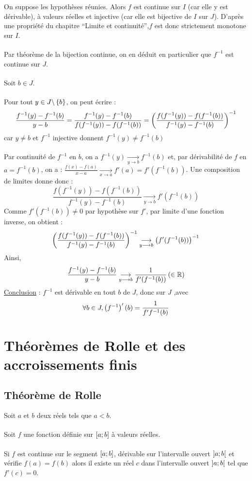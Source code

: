 \begin{dem}
    On suppose les hypothèses réunies. Alors \(f\) est continue sur \(I\) (car elle y est dérivable), à valeurs réelles et injective (car elle est bijective de \(I\) sur \(J\)). D’après une propriété du chapitre “Limite et continuité”,\(f\) est donc strictement monotone sur \(I\).\\~\\
    Par théorème de la bijection continue, on en déduit en particulier que \(f^{-1}\) est continue sur \(J\).\\~\\
    Soit \(b \in J\).\\~\\
    Pour tout \(y \in J\backslash \left\lbrace b\right\rbrace\), on peut écrire :
    \[\frac{f^{-1}(y)-f^{-1}(b)}{y-b} = \frac{f^{-1}(y) - f^{-1}(b)}{f(f^{-1}(y))-f(f^{-1}(b))} = \left(\frac{f(f^{-1}(y))-f(f^{-1}(b))}{f^{-1}(y) - f^{-1}(b)}\right)^{-1}\]
    car \(y \neq b \) et \(f^{-1}\) injective donnent \(f^{-1}(y) \neq f^{-1}(b)\)\\~\\
    Par continuité de \(f^{-1}\) en \(b\), on a \(f^{-1}(y) \underset{y \to b}{\to} f^{-1}(b)\) et, par dérivabilité de \(f\) en \(a = f^{-1}(b)\), on a : 
    \(\frac{f(x)-f(a)}{x-a} \underset{x \to a}{\to} f'(a) = f'(f^{-1}(b))\). Une composition de limites donne donc :
    \[\frac{f(f^{-1}(y))-f(f^{-1}(b))}{f^{-1}(y) - f^{-1}(b)} \underset{y \to b}{\to} f'(f^{-1}(b))\]
    Comme \(f'(f^{-1}(b))\neq 0 \) par hypothèse sur \(f'\), par limite d'une fonction inverse, on obtient : 
    \[\left(\frac{f(f^{-1}(y))-f(f^{-1}(b))}{f^{-1}(y) - f^{-1}(b)}\right)^{-1} \underset{y \longrightarrow b}{\longrightarrow} \left(f'(f^{-1}(b))\right)^{-1}\]
    Ainsi,
    \[\frac{f^{-1}(y)-f^{-1}(b)}{y-b} \underset{y \longrightarrow b}{\longrightarrow} \frac{1}{f'(f^{-1}(b))} \left( \in \mathbb{R}\right)\]
    \underline{Conclusion} : \(f^{-1}\) est dérivable en tout \(b\) de \(J\), donc sur \(J\) ,avec 
    \[\forall b \in J,\left(f^{-1}\right)'(b) = \frac{1}{f'f^{-1}(b)}\]
\end{dem}

\section{Théorèmes de Rolle et des accroissements finis}
\subsection{Théorème de Rolle}
\begin{theo}
    Soit \(a\) et \(b\) deux réels tels que \(a < b\).\\~\\
    Soit \(f\) une fonction définie sur \(\left[a;b\right]\) à valeurs réelles.\\~\\
    Si \(f\) est continue sur le segment \(\left[a;b\right]\), dérivable sur l’intervalle ouvert \(\left]a;b\right[\) et vérifie \(f (a) = f (b)\) alors il existe un réel \(c\) dans l’intervalle ouvert \(\left]a;b\right[\) tel que \(f '(c) = 0\).
\end{theo}

